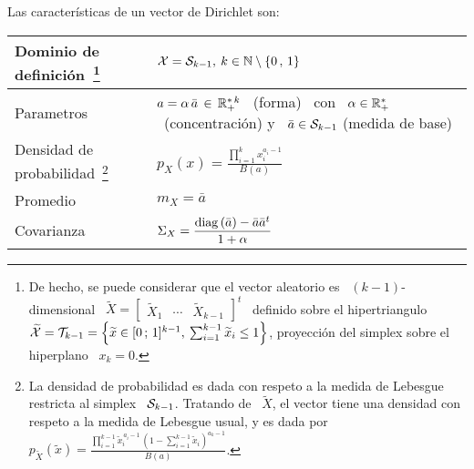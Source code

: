 Las caracter\'isticas de un vector de Dirichlet son:
%
\begin{center}
\begin{tabular}
{
|>{\vspace{-2mm}}p{}|
>{\vspace{-2mm}\hspace{2mm}}p{}|
}
%
\hline
%
Dominio de definici\'on~\footnote{De hecho, se puede considerar que el vector
aleatorio es \ $(k-1)$-dimensional \ $\widetilde{X} = \begin{bmatrix}
\widetilde{X}_1 & \cdots & \widetilde{X}_{k-1} \end{bmatrix}^t$ \ definido sobre
el hipertriangulo \ $\widetilde{\mathcal{X}} = \mathcal{T}_{k-1} = \left\{ \widetilde{x} \in [0
\, ; \, 1]^{k-1}, \: \sum_{i=1}^{k-1} \widetilde{x}_i \le 1 \right\}$, proyecci\'on
del simplex sobre el hiperplano \ $x_k = 0$.\label{Foot:MP:DirichletXtilde}} &
$\mathcal{X} = \mathcal{S}_{k-1}, \: k \in \mathbb{N} \setminus \{ 0 \, , \, 1 \}$\\[2mm]
\hline
%
Parametros & $a = \alpha \, \bar{a} \, \in \, \mathbb{R}_+^{* \, k}$ \ (forma) \ con
\ $\alpha \in \mathbb{R}_+^*$ \ (concentraci\'on) y \ $\bar{a} \in \mathcal{S}_{k-1}$
(medida de base)\\[2mm]
\hline
%
Densidad de probabilidad~\footnote{La densidad de probabilidad es dada con
respeto a la medida de Lebesgue restricta al simplex \ $\mathcal{S}_{k-1}$. Tratando
de \ $\widetilde{X}$, el vector tiene una densidad con respeto a la medida de
Lebesgue usual, y es dada por \ $p_{\widetilde{X}}\left( \widetilde{x} \right) =
\frac{\prod_{i=1}^{k-1} \widetilde{x}_i^{\, a_i-1} \, \left( 1 -
\sum_{i=1}^{k-1} \widetilde{x}_i
\right)^{a_k-1}}{B(a)}$.\label{Foot:MP:DirichletDensidad}} & $\displaystyle
p_X(x) = \frac{\prod_{i=1}^k x_i^{a_i-1}}{B(a)}$\\[2mm]
\hline
Promedio & $\displaystyle m_X = \bar{a}$\\[2.5mm]
\hline
%
Covarianza & $\displaystyle \Sigma_X = \frac{\operatorname{diag}\left( \bar{a} \right) -
\bar{a} \bar{a}^t}{1 + \alpha}$\\[2.5mm]
\hline

\end{tabular}
\end{center}
